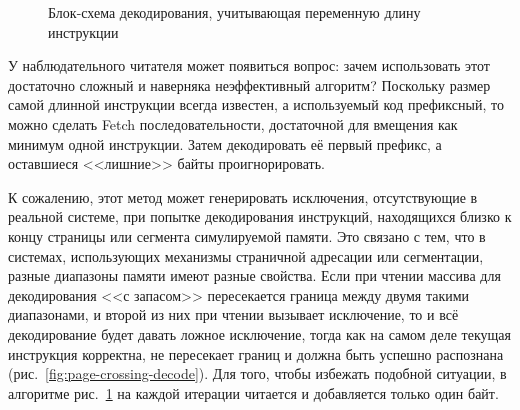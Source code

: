 \begin{figure}[htb]
    \centering
    \caption{Блок-схема декодирования, учитывающая переменную длину инструкции}
    \label{fig:variable-length}
\end{figure}

У наблюдательного читателя может появиться вопрос: зачем использовать этот достаточно сложный и наверняка неэффективный алгоритм? Поскольку размер самой длинной инструкции всегда известен, а используемый код префиксный, то можно сделать Fetch последовательности, достаточной для вмещения как минимум одной инструкции. Затем декодировать её первый префикс, а оставшиеся <<лишние>> байты проигнорировать.

К сожалению, этот метод может генерировать исключения, отсутствующие в реальной системе, при попытке декодирования инструкций, находящихся близко к концу страницы или сегмента симулируемой памяти. Это связано с тем, что в системах, использующих механизмы страничной адресации или сегментации, разные диапазоны памяти имеют разные свойства. Если при чтении массива для декодирования <<с запасом>> пересекается граница между двумя такими диапазонами, и второй из них при чтении вызывает исключение, то и всё декодирование будет давать ложное исключение, тогда как на самом деле текущая инструкция корректна, не пересекает границ и должна быть успешно распознана (рис.~\ref{fig:page-crossing-decode}). Для того, чтобы избежать подобной ситуации, в алгоритме рис.~\ref{fig:variable-length} на каждой итерации читается и добавляется только один байт.

